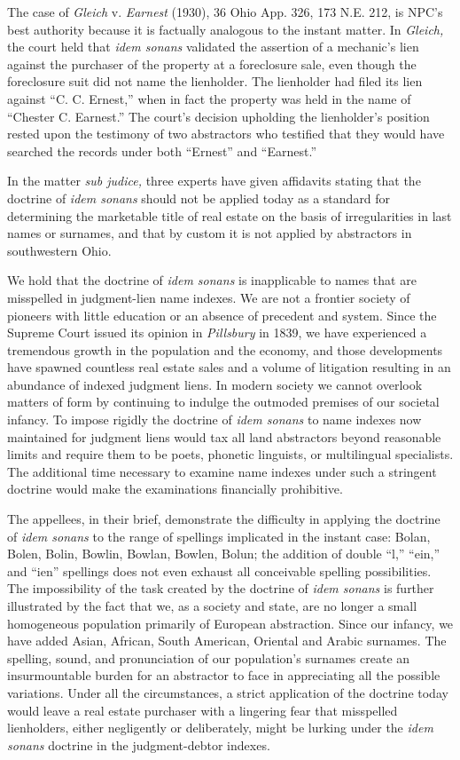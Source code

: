 The case of \textit{Gleich} v. \textit{Earnest} (1930), 36 Ohio App. 326, 173
N.E. 212, is NPC's best authority because it is factually analogous to the
instant matter. In \textit{Gleich,} the court held that \textit{idem sonans}
validated the assertion of a mechanic's lien against the purchaser of the
property at a foreclosure sale, even though the foreclosure suit did not name
the lienholder. The lienholder had filed its lien against ``C. C. Ernest,''
when in fact the property was held in the name of ``Chester C. Earnest.'' The
court's decision upholding the lienholder's position rested upon the testimony
of two abstractors who testified that they would have searched the records
under both ``Ernest'' and ``Earnest.''

In the matter \textit{sub judice,} three experts have given affidavits stating
that the doctrine of \textit{idem sonans} should not be applied today as a
standard for determining the marketable title of real estate on the basis of
irregularities in last names or surnames, and that by custom it is not applied
by abstractors in southwestern Ohio.

We hold that the doctrine of \textit{idem sonans} is inapplicable to names that
are misspelled in judgment-lien name indexes. We are not a frontier society of
pioneers with little education or an absence of precedent and system. Since the
Supreme Court issued its opinion in \textit{Pillsbury} in 1839, we have
experienced a tremendous growth in the population and the economy, and those
developments have spawned countless real estate sales and a volume of
litigation resulting in an abundance of indexed judgment liens. In modern
society we cannot overlook matters of form by continuing to indulge the
outmoded premises of our societal infancy. To impose rigidly the doctrine of
\textit{idem sonans} to name indexes now maintained for judgment liens would
tax all land abstractors beyond reasonable limits and require them to be poets,
phonetic linguists, or multilingual specialists. The additional time necessary
to examine name indexes under such a stringent doctrine would make the
examinations financially prohibitive.

The appellees, in their brief, demonstrate the difficulty in applying the
doctrine of \textit{idem sonans} to the range of spellings implicated in the
instant case: Bolan, Bolen, Bolin, Bowlin, Bowlan, Bowlen, Bolun; the addition
of double ``l,'' ``ein,'' and ``ien'' spellings does not even exhaust all
conceivable spelling possibilities. The impossibility of the task created by
the doctrine of \textit{idem sonans} is further illustrated by the fact that
we, as a society and state, are no longer a small homogeneous population
primarily of European abstraction. Since our infancy, we have added Asian,
African, South American, Oriental and Arabic surnames. The spelling, sound, and
pronunciation of our population's surnames create an insurmountable burden for
an abstractor to face in appreciating all the possible variations. Under all
the circumstances, a strict application of the doctrine today would leave a
real estate purchaser with a lingering fear that misspelled lienholders, either
negligently or deliberately, might be lurking under the \textit{idem sonans}
doctrine in the judgment-debtor indexes.


